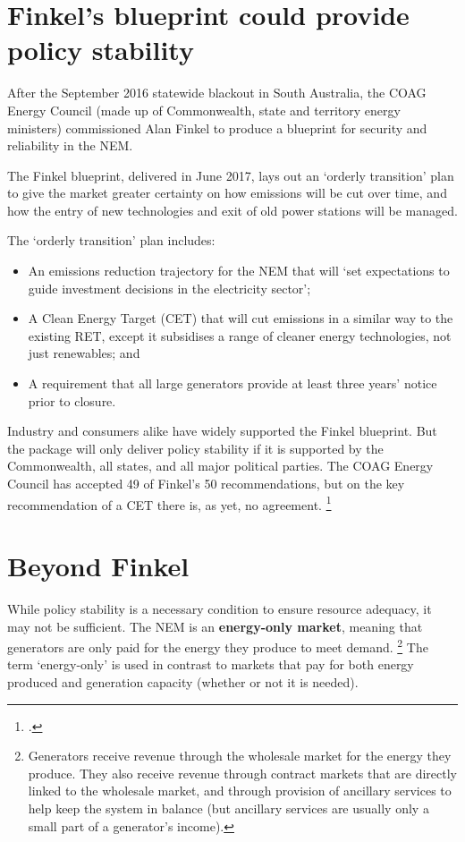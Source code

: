 \documentclass[FrontPage]{grattan}
\begin{document}
\section{Finkel's blueprint could provide policy stability}\label{sec:finkel-review-focused-on-security-and-reliability}
After the September 2016 statewide blackout in South Australia, the COAG Energy Council (made up of Commonwealth, state and territory energy ministers) commissioned Alan Finkel to produce a blueprint for security and reliability in the NEM\@.

The Finkel blueprint, delivered in June 2017, lays out an `orderly transition' plan to give the market greater certainty on how emissions will be cut over time, and how the entry of new technologies and exit of old power stations will be managed.

The `orderly transition' plan includes:
\begin{itemize}
    \item An emissions reduction trajectory for the NEM that will `set expectations to guide investment decisions in the electricity sector';
    \item A Clean Energy Target (CET) that will cut emissions in a similar way to the existing RET, except it subsidises a range of cleaner energy technologies, not just renewables; and
    \item A requirement that all large generators provide at least three years' notice prior to closure.
\end{itemize}

Industry and consumers alike have widely supported the Finkel blueprint. But the package will only deliver policy stability if it is supported by the Commonwealth, all states, and all major political parties. The COAG Energy Council has accepted 49 of Finkel's 50 recommendations, but on the key recommendation of a CET there is, as yet, no agreement.%
\footcite{COAGEC2017JulyCommunique}


\section{Beyond Finkel}\label{sec:beyond-finkel}
While policy stability is a necessary condition to ensure resource adequacy, it may not be sufficient. The NEM is an \textbf{energy-only market}, meaning that generators are only paid for the energy they produce to meet demand.%
\footnote{Generators receive revenue through the wholesale market for the energy they produce. They also receive revenue through contract markets that are directly linked to the wholesale market, and through provision of ancillary services to help keep the system in balance (but ancillary services are usually only a small part of a generator's income).}
The term `energy-only' is used in contrast to markets that pay for both energy produced and generation capacity (whether or not it is needed).
\end{document}
